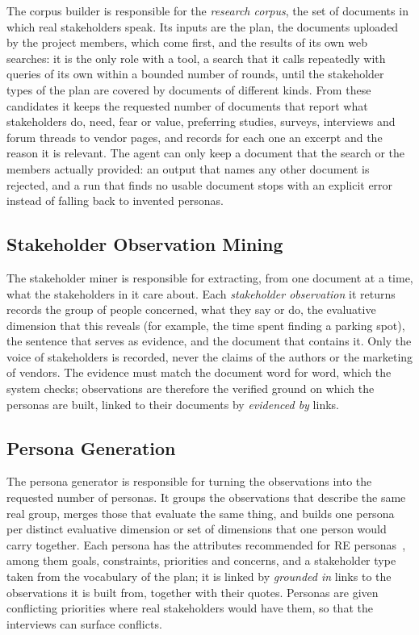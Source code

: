 The corpus builder is responsible for the \emph{research corpus}, the set of documents in which real stakeholders speak. Its inputs are the plan, the documents uploaded by the project members, which come first, and the results of its own web searches: it is the only role with a tool, a search that it calls repeatedly with queries of its own within a bounded number of rounds, until the stakeholder types of the plan are covered by documents of different kinds. From these candidates it keeps the requested number of documents that report what stakeholders do, need, fear or value, preferring studies, surveys, interviews and forum threads to vendor pages, and records for each one an excerpt and the reason it is relevant. The agent can only keep a document that the search or the members actually provided: an output that names any other document is rejected, and a run that finds no usable document stops with an explicit error instead of falling back to invented personas.

\subsection{Stakeholder Observation Mining}
\label{sec:pa-mining}

The stakeholder miner is responsible for extracting, from one document at a time, what the stakeholders in it care about. Each \emph{stakeholder observation} it returns records the group of people concerned, what they say or do, the evaluative dimension that this reveals (for example, the time spent finding a parking spot), the sentence that serves as evidence, and the document that contains it. Only the voice of stakeholders is recorded, never the claims of the authors or the marketing of vendors. The evidence must match the document word for word, which the system checks; observations are therefore the verified ground on which the personas are built, linked to their documents by \emph{evidenced by} links.

\subsection{Persona Generation}
\label{sec:pa-persona-generation}

The persona generator is responsible for turning the observations into the requested number of personas. It groups the observations that describe the same real group, merges those that evaluate the same thing, and builds one persona per distinct evaluative dimension or set of dimensions that one person would carry together. Each persona has the attributes recommended for RE personas~\cite{karolita2023what}, among them goals, constraints, priorities and concerns, and a stakeholder type taken from the vocabulary of the plan; it is linked by \emph{grounded in} links to the observations it is built from, together with their quotes. Personas are given conflicting priorities where real stakeholders would have them, so that the interviews can surface conflicts.

